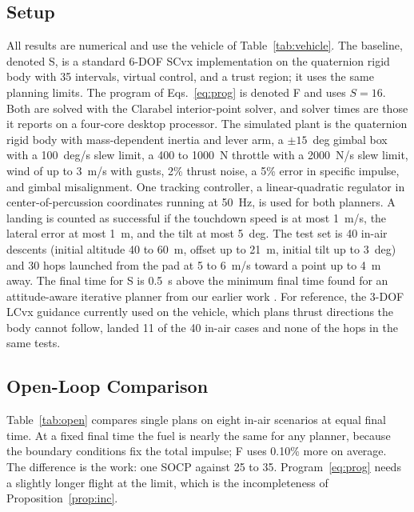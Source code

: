 \subsection{Setup}
All results are numerical and use the vehicle of Table~\ref{tab:vehicle}. The baseline, denoted S, is a standard 6-DOF SCvx
implementation \cite{mao2016,szmuk2018} on the quaternion rigid body with 35 intervals, virtual control, and a trust region; it
uses the same planning limits. The program of Eqs.~\eqref{eq:prog} is denoted F and uses $S=16$. Both are solved with the
Clarabel interior-point solver, and solver times are those it reports on a four-core desktop processor. The simulated plant is
the quaternion rigid body with mass-dependent inertia and lever arm, a $\pm15$~deg gimbal box with a 100~deg/s slew limit, a
400 to 1000~N throttle with a 2000~N/s slew limit, wind of up to 3~m/s with gusts, 2\% thrust noise, a 5\% error in specific
impulse, and gimbal misalignment. One tracking controller, a linear-quadratic regulator in center-of-percussion coordinates
running at 50~Hz, is used for both planners. A landing is counted as successful if the touchdown speed is at most 1~m/s, the
lateral error at most 1~m, and the tilt at most 5~deg. The test set is 40 in-air descents (initial altitude 40 to 60~m, offset
up to 21~m, initial tilt up to 3~deg) and 30 hops launched from the pad at 5 to 6~m/s toward a point up to 4~m away. The final
time for S is 0.5~s above the minimum final time found for an attitude-aware iterative planner from our earlier work \cite{repo}. For
reference, the 3-DOF LCvx guidance currently used on the vehicle, which plans thrust directions the body cannot follow, landed
11 of the 40 in-air cases and none of the hops in the same tests.

\subsection{Open-Loop Comparison}
Table~\ref{tab:open} compares single plans on eight in-air scenarios at equal final time. At a fixed final time the fuel is
nearly the same for any planner, because the boundary conditions fix the total impulse; F uses 0.10\% more on average. The
difference is the work: one SOCP against 25 to 35. Program~\eqref{eq:prog} needs a slightly longer flight at the limit, which
is the incompleteness of Proposition~\ref{prop:inc}.

